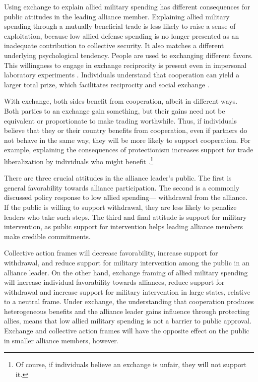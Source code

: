 \documentclass[12pt]{article}
\begin{document}
Using exchange to explain allied military spending has different consequences for public attitudes in the leading alliance member. 
Explaining allied military spending through a mutually beneficial trade is less likely to raise a sense of exploitation, because low allied defense spending is no longer presented as an inadequate contribution to collective security. 
It also matches a different underlying psychological tendency. 
People are used to exchanging different favors.
This willingness to engage in exchange reciprocity is present even in impersonal laboratory experiments \citep{McCabeetal1996}. 
Individuals understand that cooperation can yield a larger total prize, which facilitates reciprocity and social exchange \citep{Hoffmanetal1998}. 


With exchange, both sides benefit from cooperation, albeit in different ways. 
Both parties to an exchange gain something, but their gains need not be equivalent or proportionate to make trading worthwhile. 
Thus, if individuals believe that they or their country benefits from cooperation, even if partners do not behave in the same way, they will be more likely to support cooperation. 
For example, explaining the consequences of protectionism increases support for trade liberalization by individuals who might benefit \citep{RhoTomz2017}.\footnote{Of course, if individuals believe an exchange is unfair, they will not support it.}


There are three crucial attitudes in the alliance leader's public.
The first is general favorability towards alliance participation. 
The second is a commonly discussed policy response to low allied spending--- withdrawal from the alliance. 
If the public is willing to support withdrawal, they are less likely to penalize leaders who take such steps. 
The third and final attitude is support for military intervention, as public support for intervention helps leading alliance members make credible commitments. 


Collective action frames will decrease favorability, increase support for withdrawal, and reduce support for military intervention among the public in an alliance leader. 
On the other hand, exchange framing of allied military spending will increase individual favorability towards alliances, reduce support for withdrawal and increase support for military intervention in large states, relative to a neutral frame. 
Under exchange, the understanding that cooperation produces heterogeneous benefits and the alliance leader gains influence through protecting allies, means that low allied military spending is not a barrier to public approval. 
Exchange and collective action frames will have the opposite effect on the public in smaller alliance members, however. 
\end{document}

